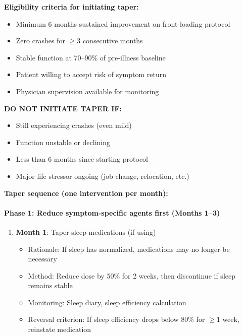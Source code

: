 \begin{protocol}
\label{prot:front-loading-taper}

\textbf{Eligibility criteria for initiating taper:}
\begin{itemize}
    \item Minimum 6 months sustained improvement on front-loading protocol
    \item Zero crashes for $\geq$3 consecutive months
    \item Stable function at 70--90\% of pre-illness baseline
    \item Patient willing to accept risk of symptom return
    \item Physician supervision available for monitoring
\end{itemize}

\textbf{DO NOT INITIATE TAPER IF:}
\begin{itemize}
    \item Still experiencing crashes (even mild)
    \item Function unstable or declining
    \item Less than 6 months since starting protocol
    \item Major life stressor ongoing (job change, relocation, etc.)
\end{itemize}

\textbf{Taper sequence (one intervention per month):}

\paragraph{Phase 1: Reduce symptom-specific agents first (Months 1--3)}

\begin{enumerate}
    \item \textbf{Month 1}: Taper sleep medications (if using)
    \begin{itemize}
        \item Rationale: If sleep has normalized, medications may no longer be necessary
        \item Method: Reduce dose by 50\% for 2 weeks, then discontinue if sleep remains stable
        \item Monitoring: Sleep diary, sleep efficiency calculation
        \item Reversal criterion: If sleep efficiency drops below 80\% for $\geq$1 week, reinstate medication
    \end{itemize}


\end{enumerate}
\end{protocol}
